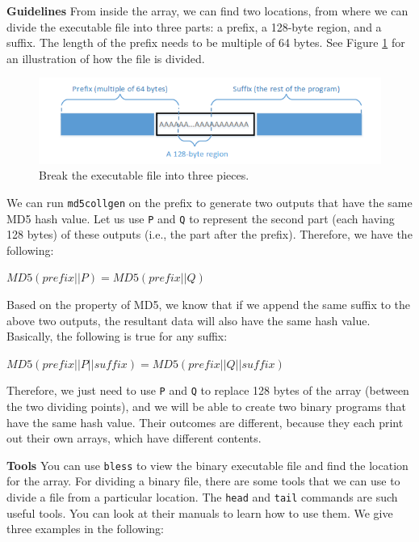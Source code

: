 \documentclass[a4paper]{article}
\begin{document}
\textbf{Guidelines} From inside the array, we can find two locations, from where we can divide the executable file into three parts: a prefix, a 128-byte region, and a suffix. The length of the prefix needs to be multiple of 64 bytes. See Figure \ref{fig:preffixsuffix} for an illustration of how the file is divided.

\begin{figure}[h]
    \centering
    \includegraphics[width=\textwidth]{prefixsuffix.png}
    \caption{Break the executable file into three pieces.}
    \label{fig:preffixsuffix}
\end{figure}

We can run \texttt{md5collgen} on the prefix to generate two outputs that have the same MD5 hash value. Let us use \texttt{P} and \texttt{Q} to represent the second part (each having 128 bytes) of these outputs (i.e., the part after the prefix). Therefore, we have the following:

\bigskip

$MD5 (prefix || P) = MD5 (prefix || Q)$

\bigskip

Based on the property of MD5, we know that if we append the same suffix to the above two outputs, the resultant data will also have the same hash value. Basically, the following is true for any suffix:

\bigskip

$MD5 (prefix || P || suffix) = MD5 (prefix || Q || suffix)$

\bigskip

Therefore, we just need to use \texttt{P} and \texttt{Q} to replace 128 bytes of the array (between the two dividing points), and we will be able to create two binary programs that have the same hash value. Their outcomes are different, because they each print out their own arrays, which have different contents.

\textbf{Tools} You can use \texttt{bless} to view the binary executable file and find the location for the array. For dividing a binary file, there are some tools that we can use to divide a file from a particular location. The \texttt{head} and \texttt{tail} commands are such useful tools. You can look at their manuals to learn how to use them. We give three examples in the following:
\end{document}
